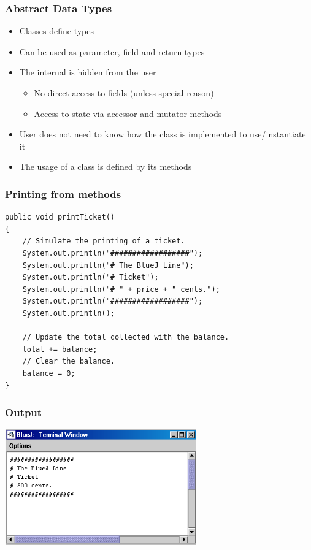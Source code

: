 \begin{frame}
\frametitle{Abstract Data Types}
\begin{itemize}
\item Classes define types
\item Can be used as parameter, field and return types
\item The internal is hidden from the user
\begin{itemize}
\item No direct access to fields (unless special reason)‏
\item Access to state via accessor and mutator methods
\end{itemize}
\item User does not need to know how the class is implemented to use/instantiate it
\item The usage of a class is defined by its methods
\end{itemize}
\end{frame}

\begin{frame}[fragile]
\frametitle{Printing from methods}
\codelist
\begin{lstlisting}
public void printTicket()‏
{
    // Simulate the printing of a ticket.
    System.out.println("##################");
    System.out.println("# The BlueJ Line");
    System.out.println("# Ticket");
    System.out.println("# " + price + " cents.");
    System.out.println("##################");
    System.out.println();
 
    // Update the total collected with the balance.
    total += balance;
    // Clear the balance.
    balance = 0;
} 
\end{lstlisting}
\end{frame}

\begin{frame}
\frametitle{Output}
\begin{center}
\includegraphics[height=5cm, keepaspectratio]{./figures/ticketOut}
\end{center}
\end{frame}

